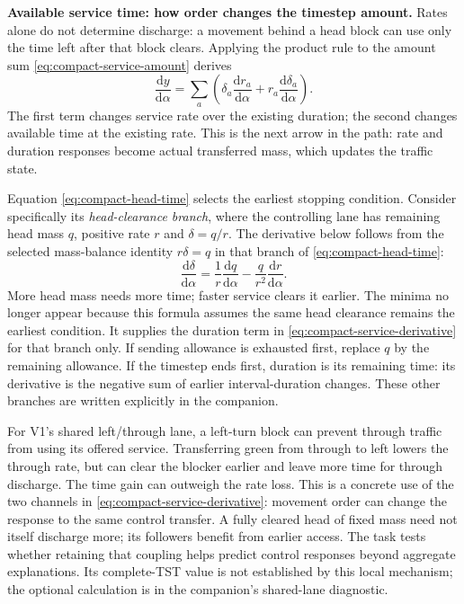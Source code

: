\documentclass[10pt,a4paper]{article}
\newcommand{\rev}[1]{{\color{revisionred}#1}}
\begin{document}
\textbf{Available service time: how order changes the timestep amount.}
Rates alone do not determine discharge: a movement behind a head block
can use only the time left after that block clears.
\rev{Applying the product rule to the amount sum \eqref{eq:compact-service-amount} derives}
\begin{equation}
 \frac{\mathrm dy}{\mathrm d\alpha}
 =\sum_a\left(\delta_a\frac{\mathrm dr_a}{\mathrm d\alpha}
              +r_a\frac{\mathrm d\delta_a}{\mathrm d\alpha}\right).
 \label{eq:compact-service-derivative}
\end{equation}
The first term changes service rate over the existing duration; the
second changes available time at the existing rate. This is the next
arrow in the path: rate and duration responses become actual transferred
mass, which updates the traffic state.

Equation \eqref{eq:compact-head-time} selects the earliest stopping
condition. Consider specifically its \emph{head-clearance branch}, where
the controlling lane has remaining head mass $q$, positive rate $r$ and
$\delta=q/r$.
\rev{The derivative below follows from the selected mass-balance identity $r\delta=q$ in that branch of \eqref{eq:compact-head-time}:}
\begin{equation}
 \frac{\mathrm d\delta}{\mathrm d\alpha}
 =\frac1r\frac{\mathrm dq}{\mathrm d\alpha}
      -\frac q{r^2}\frac{\mathrm dr}{\mathrm d\alpha}.
 \label{eq:compact-head-time-derivative}
\end{equation}
More head mass needs more time; faster service clears it earlier.
The minima no longer appear because this formula assumes the same head
clearance remains the earliest condition. It supplies the duration term
in \eqref{eq:compact-service-derivative} for that branch only.
If sending allowance is exhausted first, replace $q$ by the remaining
allowance. If the timestep ends first, duration is its remaining time:
its derivative is the negative sum of earlier interval-duration changes.
These other branches are written explicitly in the companion.

For V1's shared left/through lane, a left-turn block can prevent through
traffic from using its offered service. Transferring green from through
to left lowers the through rate, but can clear the blocker earlier and
leave more time for through discharge. The time gain can outweigh the
rate loss. This is a concrete use of the two channels in
\eqref{eq:compact-service-derivative}: movement order can change the
response to the same control transfer. A fully cleared head of fixed
mass need not itself discharge more; its followers benefit from earlier
access. The task tests whether retaining that coupling helps predict
control responses beyond aggregate explanations. Its complete-TST value
is not established by this local mechanism; the optional calculation is
in the companion's shared-lane diagnostic.
\end{document}
